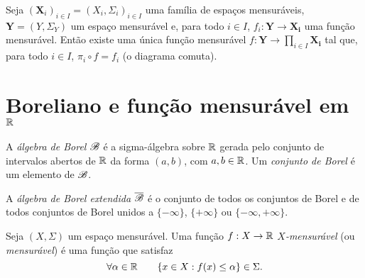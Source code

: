 \begin{prop}
Seja $(\bm X_i)_{i \in I} = (X_i,\Sigma_i)_{i \in I}$ uma família de espaços mensuráveis, $\bm Y = (Y,\Sigma_Y)$ um espaço mensurável e, para todo $i \in I$, $f_i: \bm Y \to \bm{X_i}$ uma função mensurável. Então existe uma única função mensurável $f: \bm Y \to \prod_{i \in I} \bm{X_i}$ tal que, para todo $i \in I$, $\pi_i \circ f = f_i$ (o diagrama comuta).
\begin{figure}[!h]
\centering
{}
\end{figure}
\end{prop}























\section{Boreliano e função mensurável em $\mathbb{R}$}

\begin{defi}
	A \emph{álgebra de Borel} $\mathscr{B}$ é a sigma-álgebra sobre $\mathbb{R}$ gerada pelo conjunto de intervalos abertos de $\mathbb{R}$ da forma $(a,b)$, com $a,b \in \mathbb{R}$. Um \emph{conjunto de Borel} é um elemento de $\mathscr{B}$.
\end{defi}

\begin{defi}
	A \emph{álgebra de Borel extendida} $\overline{\mathscr{B}}$ é o conjunto de todos os conjuntos de Borel e de todos conjuntos de Borel unidos a $\{-\infty\}$, $\{+\infty\}$ ou $\{-\infty,+\infty\}$.
\end{defi}

\begin{defi}
	Seja $(X,\Sigma)$ um espaço mensurável. Uma função $f: X \to \mathbb{R}$ \emph{$X$-mensurável} (ou \emph{mensurável}) é uma função que satisfaz
	\begin{equation*}
	\forall \alpha \in \mathbb{R} \qquad \{x \in X : f(x) \leq \alpha\} \in \Sigma.
	\end{equation*}
\end{defi}

